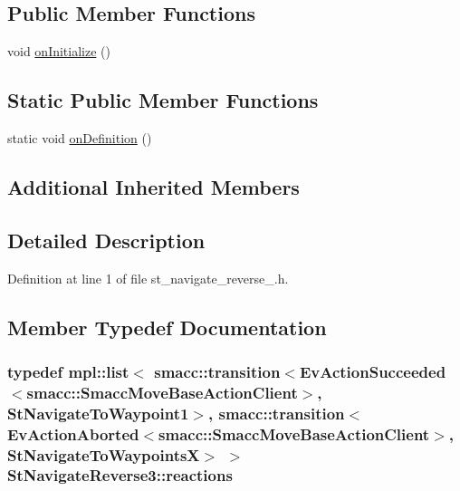 \subsection*{Public Member Functions}
\begin{DoxyCompactItemize}
\item 
void \hyperlink{structStNavigateReverse3_a4cbaaac42b28f996e98d6b50a9527a89}{on\+Initialize} ()
\end{DoxyCompactItemize}
\subsection*{Static Public Member Functions}
\begin{DoxyCompactItemize}
\item 
static void \hyperlink{structStNavigateReverse3_a1b9dbbca7ffdcaa19799f0792ca5592a}{on\+Definition} ()
\end{DoxyCompactItemize}
\subsection*{Additional Inherited Members}


\subsection{Detailed Description}


Definition at line 1 of file st\+\_\+navigate\+\_\+reverse\+\_.\+h.



\subsection{Member Typedef Documentation}
\subsubsection[{\texorpdfstring{reactions}{reactions}}]{\setlength{\rightskip}{0pt plus 5cm}typedef mpl\+::list$<$ {\bf smacc\+::transition}$<$Ev\+Action\+Succeeded$<${\bf smacc\+::\+Smacc\+Move\+Base\+Action\+Client}$>$, {\bf St\+Navigate\+To\+Waypoint1}$>$, {\bf smacc\+::transition}$<$Ev\+Action\+Aborted$<${\bf smacc\+::\+Smacc\+Move\+Base\+Action\+Client}$>$, {\bf St\+Navigate\+To\+WaypointsX}$>$ $>$ {\bf St\+Navigate\+Reverse3\+::reactions}}\hypertarget{structStNavigateReverse3_acf0fcf288b4fe012f17503c309c54caf}{}\label{structStNavigateReverse3_acf0fcf288b4fe012f17503c309c54caf}


